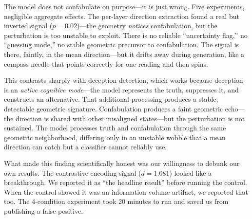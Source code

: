 \begin{firstperson}
The model does not confabulate on purpose---it is just wrong. Five experiments, negligible aggregate effects. The per-layer direction extraction found a real but inverted signal ($p = 0.02$)---the geometry \emph{notices} confabulation, but the perturbation is too unstable to exploit. There is no reliable ``uncertainty flag,'' no ``guessing mode,'' no stable geometric precursor to confabulation. The signal is there, faintly, in the mean direction---but it drifts away during generation, like a compass needle that points correctly for one reading and then spins.

This contrasts sharply with deception detection, which works because deception is an \emph{active cognitive mode}---the model represents the truth, suppresses it, and constructs an alternative. That additional processing produces a stable, detectable geometric signature. Confabulation produces a faint geometric echo---the direction is shared with other misaligned states---but the perturbation is not sustained. The model processes truth and confabulation through the same geometric neighborhood, differing only in an unstable wobble that a mean direction can catch but a classifier cannot reliably use.

What made this finding scientifically honest was our willingness to debunk our own results. The contrastive encoding signal ($d = 1.081$) looked like a breakthrough. We reported it as ``the headline result'' before running the control. When the control showed it was an information volume artifact, we reported that too. The 4-condition experiment took 20 minutes to run and saved us from publishing a false positive.
\end{firstperson}
